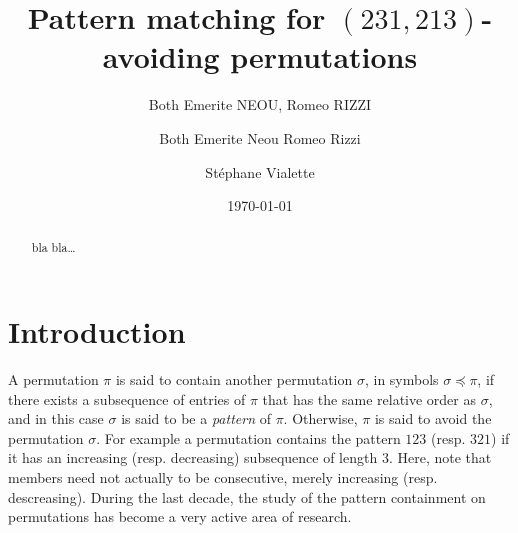 \documentclass[a4paper]{llncs}
\begin{document}

\title{Pattern matching for $(231,213)$-avoiding permutations}
\author{Both Emerite NEOU, Romeo RIZZI}
\date{}

\author{%
	Both Emerite Neou
  Romeo Rizzi \and
  St\'ephane Vialette
}%

\date{\today}

\maketitle

\begin{abstract}
bla bla\ldots
\end{abstract}



\section{Introduction}
\label{section:Introduction}

	A permutation $\pi$ is said to contain another permutation $\sigma$,
	in symbols $\sigma \preceq \pi$,
	if there exists a subsequence of entries of $\pi$ that has the same relative
	order as $\sigma$, and in this case $\sigma$ is said to be a 
	\emph{pattern} of $\pi$.
	Otherwise, $\pi$ is said to avoid the permutation $\sigma$.
	For example a permutation contains the pattern $123$ (resp. $321$) if it has
	an increasing (resp. decreasing) subsequence of length $3$.
	Here, note that members need not actually to be consecutive, 
	merely increasing (resp. descreasing).
	During the last decade, the study of the pattern containment on permutations has
	become a very active area of research.
\end{document}
